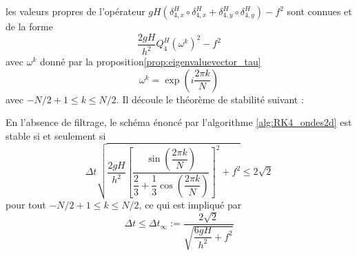 les valeurs propres de l'opérateur $gH (\delta_{4,x}^H \circ \delta_{4,x}^H + \delta_{4,y}^H \circ \delta_{4,y}^H) - f^2$ sont connues et de la forme
\begin{equation}
\dfrac{2gH}{h^2} Q_4^H (\omega^k )^2 - f^2
\end{equation} 
avec $\omega^k$ donné par la proposition\ref{prop:eigenvaluevector_tau}
\begin{equation}
\omega^k = \exp \left( i \dfrac{2 \pi k}{N} \right)
\end{equation}
avec $-N/2+1 \leq k \leq N/2$.
Il découle le théorème de stabilité suivant :
\begin{theoreme}
En l'absence de filtrage, le schéma énoncé par l'algorithme \ref{alg:RK4_ondes2d} est stable si et seulement si
\begin{equation}
\Delta t \sqrt{\dfrac{2gH}{h^2} \left[ \dfrac{\sin \left( \dfrac{2 \pi k}{N}  \right)}{\dfrac{2}{3} + \dfrac{1}{3} \cos \left( \dfrac{2 \pi k}{N}  \right)} \right]^2 + f^2} \leq 2 \sqrt{2}
\end{equation}
pour tout $-N/2+1 \leq k \leq N/2$, ce qui est impliqué par
\begin{equation}
\Delta t \leq \Delta t_{\infty} := \dfrac{2 \sqrt{2}}{\sqrt{\dfrac{6 g H}{h^2} + f^2}}
\label{eq:stabilityc_conditions_ondes2D}
\end{equation}
\end{theoreme}

